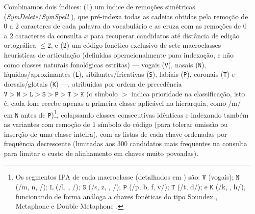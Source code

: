 \documentclass[a4paper, twocolumn, 11pt, twoside]{article}
\begin{document}
Combinamos dois índices: (1) um índice de remoções simétricas (\textit{SymDelete}/\textit{SymSpell} \citep{garbe2012symspell}), que pré-indexa todas as cadeias obtidas pela remoção de $0$ a $2$ caracteres de cada palavra do vocabulário e as cruza com as remoções de $0$ a $2$ caracteres da consulta $x$ para recuperar candidatos até distância de edição ortográfica $\le 2$, e (2) um código fonético exclusivo de sete macroclasses heurísticas de articulação (definidas operacionalmente para indexação, e não como classes naturais fonológicas estritas) --- vogais (\texttt{V}), nasais (\texttt{N}), líquidas/aproximantes (\texttt{L}), sibilantes/fricativas (\texttt{S}), labiais (\texttt{P}), coronais (\texttt{T}) e dorsais/glotais (\texttt{K}) ---, atribuídas por ordem de precedência $\texttt{V} > \texttt{N} > \texttt{L} > \texttt{S} > \texttt{P} > \texttt{T} > \texttt{K}$ (o símbolo $>$ indica prioridade na classificação, isto é, cada fone recebe apenas a primeira classe aplicável na hierarquia, como /m/ em \texttt{N} antes de \texttt{P})\footnote{Os segmentos IPA de cada macroclasse (detalhados em \citet{araujo2026lipspell}) são: $\texttt{V}$ (vogais); $\texttt{N}$ (/m, n, /); $\texttt{L}$ (/l, \textturny, \textfishhookr/); $\texttt{S}$ (/s, z, \textesh, \textyogh/); $\texttt{P}$ (/p, b, f, v/); $\texttt{T}$ (/t, d/); e $\texttt{K}$ (/k, , h/), funcionando de forma análoga a chaves fonéticas do tipo Soundex \citep{russell1918soundex,kukich1992techniques}, Metaphone \citep{philips1990metaphone} e Double Metaphone \citep{philips2000double}.}, colapsando classes consecutivas idênticas e indexando também as variantes com remoção de $1$ símbolo do código (para tolerar omissão ou inserção de uma classe inteira), com as listas de cada chave ordenadas por frequência decrescente (limitadas aos $300$ candidatos mais frequentes na consulta para limitar o custo de alinhamento em chaves muito povoadas).
\end{document}
